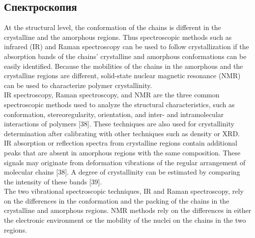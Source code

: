 \subsection{Спектроскопия}
At the
structural level, the conformation of the chains is different in the crystalline and the
amorphous regions. Thus spectroscopic methods such as infrared (IR) and Raman
spectroscopy can be used to follow crystallization if the absorption bands of the chains’
crystalline and amorphous conformations can be easily identified.
Because the mobilities
of the chains in the amorphous and the crystalline regions are different, solid-state
nuclear magnetic resonance (NMR) can be used to characterize polymer crystallinity.\\
IR spectroscopy, Raman spectroscopy, and NMR are the three common spectroscopic
methods used to analyze the structural characteristics, such as conformation,
stereoregularity, orientation, and inter- and intramolecular interactions of polymers
[38]. These techniques are also used for crystallinity determination after calibrating
with other techniques such as density or XRD.\\
IR absorption or reflection
spectra from crystalline regions contain additional peaks that are absent in amorphous
regions with the same composition. These signals may originate from deformation
vibrations of the regular arrangement of molecular chains [38]. A degree of crystallinity
can be estimated by comparing the intensity of these bands [39].\\

The two vibrational spectroscopic
techniques, IR and Raman spectroscopy, rely on the differences in the conformation
and the packing of the chains in the crystalline and amorphous regions. NMR
methods rely on the differences in either the electronic environment or the mobility
of the nuclei on the chains in the two regions.\\

